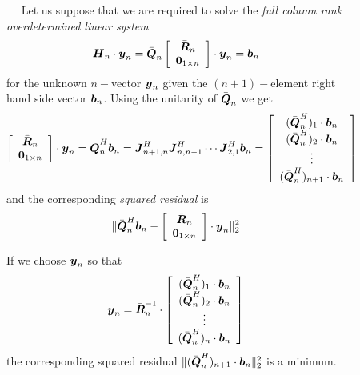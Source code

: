 \begin{figure}
{\begin{minipage} {140.0mm}
$\quad$ Let us suppose that we are required to solve the {\em full column 
rank overdetermined 
linear system\/}
\[
{\bmi H}_{n}\cdot {\bmi y}_{n} = \bar{\bmi Q}_{n}
\left[ \begin{array}{c}\bar{\bmi R}_{n}\\{\bf 0}_{1 \times n}\end{array} 
\right]
\cdot {\bmi y}_{n}= {\bmi b}_{n}
\]
for the unknown $n-$vector ${\bmi y}_{n}$ given the $(n+1)-$element right 
hand side vector ${\bmi b}_{n}$. Using the unitarity of  $\bar{\bmi 
Q}_{n}$ we get
\[
\left[ \begin{array}{c}\bar{\bmi R}_{n}\\{\bf 0}_{1 \times n}\end{array} 
\right]\cdot 
{\bmi y}_{n}= \bar{\bmi Q}^{H}_{n}{\bmi b}_{n}= 
{\bmi J}^{H}_{n+1,n}{\bmi J}^{H}_{n,n-1}\cdots {\bmi J}^{H}_{2,1}{\bmi 
b}_{n}=
\left[\begin{array}{c}
(\bar{\bmi Q}^{H}_{n})_{1}\cdot{\bmi b}_{n}\\ 
(\bar{\bmi Q}^{H}_{n})_{2}\cdot{\bmi b}_{n}\\
\vdots\\
(\bar{\bmi Q}^{H}_{n})_{n+1}\cdot{\bmi b}_{n}
\end{array}  \right]
\]
and the corresponding {\em squared residual \/} is 
\[
\| \bar{\bmi Q}^{H}_{n}{\bmi b}_{n} - \left[ \begin{array}{c}\bar{\bmi 
R}_{n}\\
{\bf 0}_{1 \times n}\end{array} \right]\cdot 
{\bmi y}_{n} \|_{2}^{2}
\]



If we choose ${\bmi y}_{n}$ so that 
\[
{\bmi y}_{n}=
\bar{\bmi R}^{-1}_{n}\cdot 
\left[\begin{array}{c}
(\bar{\bmi Q}^{H}_{n})_{1}\cdot{\bmi b}_{n}\\ 
(\bar{\bmi Q}^{H}_{n})_{2}\cdot{\bmi b}_{n}\\
\vdots\\
(\bar{\bmi Q}^{H}_{n})_{n}\cdot{\bmi b}_{n}
\end{array}  \right]
\]
the corresponding squared residual 
$\| (\bar{\bmi Q}^{H}_{n})_{n+1}\cdot{\bmi b}_{n} \|_{2}^{2}$ is a minimum.





\vspace{6 mm}
\end{minipage}
}
\end{figure}

